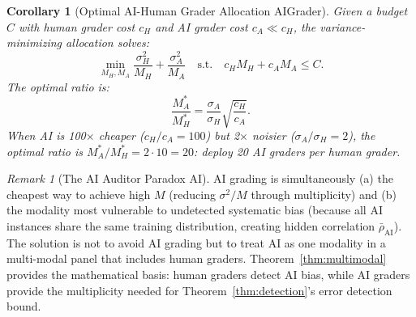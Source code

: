 \documentclass[11pt,a4paper]{article}
\newtheorem{corollary}[theorem]{Corollary}
\theoremstyle{definition}
\theoremstyle{remark}
\newtheorem{remark}[theorem]{Remark}
\begin{document}
\begin{corollary}[Optimal AI-Human Grader Allocation AIGrader]
\label{cor:optimal_allocation}
Given a budget $C$ with human grader cost $c_H$ and AI grader cost $c_A \ll c_H$, the variance-minimizing allocation solves:
\begin{equation}
    \min_{M_H, M_A} \frac{\sigma_H^2}{M_H} + \frac{\sigma_A^2}{M_A} \quad \text{s.t.} \quad c_H M_H + c_A M_A \le C.
\end{equation}
The optimal ratio is:
\begin{equation}
    \frac{M_A^*}{M_H^*} = \frac{\sigma_A}{\sigma_H} \sqrt{\frac{c_H}{c_A}}.
\end{equation}
When AI is 100$\times$ cheaper ($c_H/c_A = 100$) but 2$\times$ noisier ($\sigma_A/\sigma_H = 2$), the optimal ratio is $M_A^*/M_H^* = 2 \cdot 10 = 20$: deploy 20 AI graders per human grader.
\end{corollary}
\begin{remark}[The AI Auditor Paradox AI]
AI grading is simultaneously (a) the cheapest way to achieve high $M$ (reducing $\sigma^2/M$ through multiplicity) and (b) the modality most vulnerable to undetected systematic bias (because all AI instances share the same training distribution, creating hidden correlation $\bar{\rho}_{\text{AI}}$). The solution is not to avoid AI grading but to treat AI as one modality in a multi-modal panel that includes human graders. Theorem~\ref{thm:multimodal} provides the mathematical basis: human graders detect AI bias, while AI graders provide the multiplicity needed for Theorem~\ref{thm:detection}'s error detection bound.
\end{remark}
\end{document}
